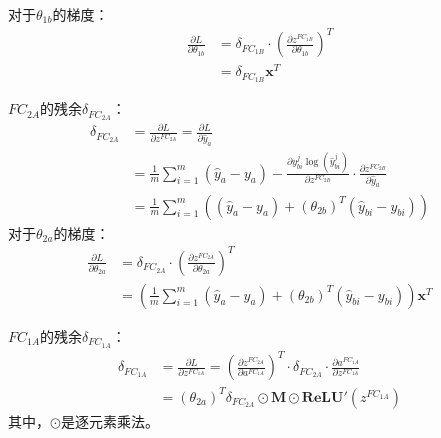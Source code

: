 \begin{solution}
\begin{enumerate}
        对于$\theta_{1b}$的梯度：
        \begin{align*}
            \frac{\partial L}{\partial \theta_{1b}} &= \delta_{FC_{1B}} \cdot \left(\frac{\partial z^{FC_{1B}}}{\partial \theta_{1b}}\right)^T \\
            &=\delta_{FC_{1B}}\bm{x}^T
        \end{align*}

        $FC_{2A}$的残余$\delta_{FC_{2A}}$：
        \begin{align*}
            \delta_{FC_{2A}} &= \frac{\partial L}{\partial z^{FC_{2A}}} = \frac{\partial L}{\partial \hat{y}_a} \\
            &= \frac{1}{m} \sum_{i=1}^m \left(\hat{y}_a-y_a\right) - \frac{\partial y_{b i}^{j} \log \left(\widehat{y}_{b i}^{j}\right)}{\partial z^{FC_{2B}}}\cdot\frac{\partial z^{FC_{2B}}}{\partial\hat{y}_a}\\
            &= \frac{1}{m} \sum_{i=1}^m \left(\left(\hat{y}_a-y_a\right) + \left(\theta_{2b}\right)^T\left(\hat{y}_{bi}-y_{bi}\right)\right)
        \end{align*}
        对于$\theta_{2a}$的梯度：
        \begin{align*}
            \frac{\partial L}{\partial \theta_{2a}} &= \delta_{FC_{2A}} \cdot \left(\frac{\partial z^{FC_{2A}}}{\partial \theta_{2a}}\right)^T \\
            &=\left(\frac{1}{m} \sum_{i=1}^m \left(\hat{y}_a-y_a\right) + \left(\theta_{2b}\right)^T\left(\hat{y}_{bi}-y_{bi}\right)\right)\bm{x}^T
        \end{align*}

        $FC_{1A}$的残余$\delta_{FC_{1A}}$：
        \begin{align*}
            \delta_{FC_{1A}} &= \frac{\partial L}{\partial z^{FC_{1A}}} 
            =\left(\frac{\partial z^{FC_{2A}}}{\partial a^{FC_{1A}}}\right)^T \cdot \delta_{FC_{2A}} \cdot \frac{\partial a^{FC_{1A}}}{\partial z^{FC_{1A}}}\\
            &=  (\theta_{2a})^T \delta_{FC_{2A}} \odot \textbf{M} \odot \textbf{ReLU}'(z^{FC_{1A}})
        \end{align*}
        其中，$\odot$是逐元素乘法。


\end{enumerate}
\end{solution}
